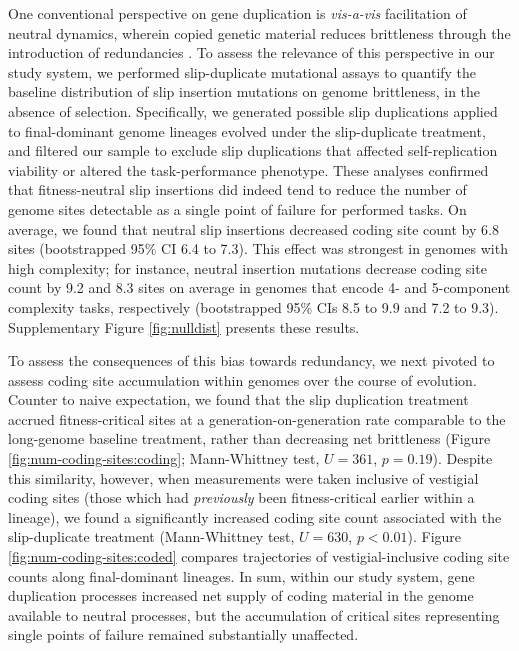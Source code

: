 One conventional perspective on gene duplication is \textit{vis-a-vis} facilitation of neutral dynamics, wherein copied genetic material reduces brittleness through the introduction of redundancies \citep{wagner1996genetic}.
To assess the relevance of this perspective in our study system, we performed slip-duplicate mutational assays to quantify the baseline distribution of slip insertion mutations on genome brittleness, in the absence of selection.
Specifically, we generated possible slip duplications applied to final-dominant genome lineages evolved under the slip-duplicate treatment, and filtered our sample to exclude slip duplications that affected self-replication viability or altered the task-performance phenotype.
These analyses confirmed that fitness-neutral slip insertions did indeed tend to reduce the number of genome sites detectable as a single point of failure for performed tasks.
On average, we found that neutral slip insertions decreased coding site count by 6.8 sites (bootstrapped 95\% CI 6.4 to 7.3).
This effect was strongest in genomes with high complexity; for instance, neutral insertion mutations decrease coding site count by 9.2 and 8.3 sites on average in genomes that encode 4- and 5-component complexity tasks, respectively (bootstrapped 95\% CIs 8.5 to 9.9 and 7.2 to 9.3).
Supplementary Figure \ref{fig:nulldist} presents these results.

To assess the consequences of this bias towards redundancy, we next pivoted to assess coding site accumulation within genomes over the course of evolution.
Counter to naive expectation, we found that the slip duplication treatment accrued fitness-critical sites at a generation-on-generation rate comparable to the long-genome baseline treatment, rather than decreasing net brittleness (Figure \ref{fig:num-coding-sites:coding}; Mann-Whittney test, $U=361$, $p=0.19$).
Despite this similarity, however, when measurements were taken inclusive of vestigial coding sites (those which had \textit{previously} been fitness-critical earlier within a lineage), we found a significantly increased coding site count associated with the slip-duplicate treatment (Mann-Whittney test, $U=630$, $p<0.01$).
Figure \ref{fig:num-coding-sites:coded} compares trajectories of vestigial-inclusive coding site counts along final-dominant lineages.
In sum, within our study system, gene duplication processes increased net supply of coding material in the genome available to neutral processes, but the accumulation of critical sites representing single points of failure remained substantially unaffected.

